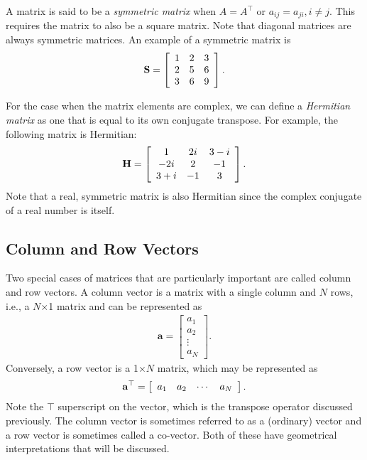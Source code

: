 A matrix is said to be a \emph{symmetric matrix} when $A = A^\top$ or $a_{ij} = a_{ji}, i \ne j$. This requires the matrix to also be a square matrix. Note that diagonal matrices are always symmetric matrices. An example of a symmetric matrix is
\begin{align}
  \mathbf{S} = 
  \left[ \begin{array}{c c c} 1 & 2 & 3 \\ 2 & 5 & 6 \\ 3 & 6 & 9 \end{array} \right]. \nonumber
\end{align}

For the case when the matrix elements are complex, we can define a \emph{Hermitian matrix} as one that is equal to its own conjugate transpose. For example, the following matrix is Hermitian:
\begin{align}
    \mathbf{H} = 
  \left[ \begin{array}{c c c} 1 & 2i & 3 - i \\ -2i & 2 & -1 \\ 3 + i & -1 & 3 \end{array} \right]. \nonumber
\end{align}
Note that a real, symmetric matrix is also Hermitian since the complex conjugate of a real number is itself.

\subsection{Column and Row Vectors}

Two special cases of matrices that are particularly important are called column and row vectors. A column vector is a matrix with a single column and $N$ rows, i.e., a $N$$\times$1 matrix and can be represented as
\begin{align}
  \mathbf{a} = 
  \left[ \begin{array}{c} a_{1} \\
  						  a_{2} \\
						  \vdots \\
						  a_{N} \end{array} \right].
\end{align}
Conversely, a row vector is a 1$\times$$N$ matrix, which may be represented as
\begin{align}
  \mathbf{a}^\top = 
  \left[ \begin{array}{c c c c} a_{1} & a_{2} & \cdots & a_{N} \end{array} \right].
\end{align}
Note the $\top$ superscript on the vector, which is the transpose operator discussed previously. The column vector is sometimes referred to as a (ordinary) vector and a row vector is sometimes called a co-vector. Both of these have geometrical interpretations that will be discussed.


